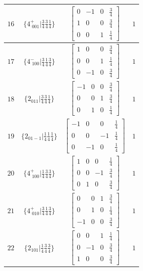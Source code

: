\documentclass[fleqn,8pt]{jsarticle}
\begin{document}
\begin{longtable}{cccc}
$ 16 $ & $ \{4^{+}_{\,\,001}|\frac{3}{4} \frac{3}{4} \frac{1}{4}\} $ & $ \begin{bmatrix} 0 & -1 & 0 & \frac{3}{4} \\ 1 & 0 & 0 & \frac{3}{4} \\ 0 & 0 & 1 & \frac{1}{4} \end{bmatrix} $ & $ 1 $ \\ \hline
$ 17 $ & $ \{4^{-}_{\,\,100}|\frac{3}{4} \frac{1}{4} \frac{3}{4}\} $ & $ \begin{bmatrix} 1 & 0 & 0 & \frac{3}{4} \\ 0 & 0 & 1 & \frac{1}{4} \\ 0 & -1 & 0 & \frac{3}{4} \end{bmatrix} $ & $ 1 $ \\ \hline
$ 18 $ & $ \{2{}_{011}|\frac{3}{4} \frac{3}{4} \frac{1}{4}\} $ & $ \begin{bmatrix} -1 & 0 & 0 & \frac{3}{4} \\ 0 & 0 & 1 & \frac{3}{4} \\ 0 & 1 & 0 & \frac{1}{4} \end{bmatrix} $ & $ 1 $ \\ \hline
$ 19 $ & $ \{2{}_{01-1}|\frac{1}{4} \frac{1}{4} \frac{1}{4}\} $ & $ \begin{bmatrix} -1 & 0 & 0 & \frac{1}{4} \\ 0 & 0 & -1 & \frac{1}{4} \\ 0 & -1 & 0 & \frac{1}{4} \end{bmatrix} $ & $ 1 $ \\ \hline
$ 20 $ & $ \{4^{+}_{\,\,100}|\frac{1}{4} \frac{3}{4} \frac{3}{4}\} $ & $ \begin{bmatrix} 1 & 0 & 0 & \frac{1}{4} \\ 0 & 0 & -1 & \frac{3}{4} \\ 0 & 1 & 0 & \frac{3}{4} \end{bmatrix} $ & $ 1 $ \\ \hline
$ 21 $ & $ \{4^{+}_{\,\,010}|\frac{3}{4} \frac{1}{4} \frac{3}{4}\} $ & $ \begin{bmatrix} 0 & 0 & 1 & \frac{3}{4} \\ 0 & 1 & 0 & \frac{1}{4} \\ -1 & 0 & 0 & \frac{3}{4} \end{bmatrix} $ & $ 1 $ \\ \hline
$ 22 $ & $ \{2{}_{101}|\frac{1}{4} \frac{3}{4} \frac{3}{4}\} $ & $ \begin{bmatrix} 0 & 0 & 1 & \frac{1}{4} \\ 0 & -1 & 0 & \frac{3}{4} \\ 1 & 0 & 0 & \frac{3}{4} \end{bmatrix} $ & $ 1 $ \\ \hline

\end{longtable}
\end{document}
